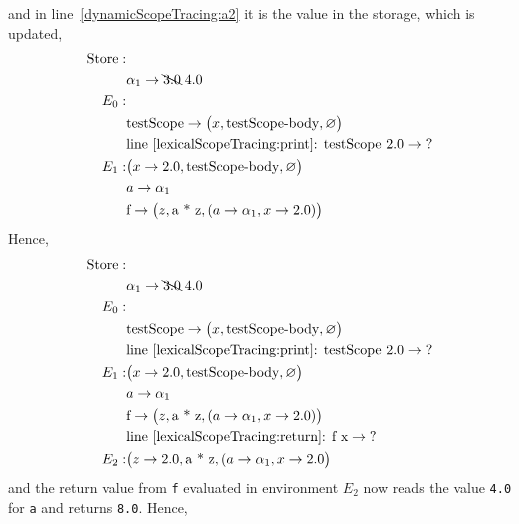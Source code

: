 and in line~\ref{dynamicScopeTracing:a2} it is the value in the storage, which is updated,
\begin{align*}
  \text{Store}: &\\
  & \alpha_1 \rightarrow \bcancel{3.0}\; 4.0\\
  E_0:&\\
      &\text{testScope} \rightarrow \big(x, \text{testScope-body}, \varnothing\big)\\
      & \text{line~\ref{lexicalScopeTracing:print}: testScope 2.0} \rightarrow \text{?}\\
  E_1: & \big(x\rightarrow 2.0, \text{testScope-body}, \varnothing\big)\\
      & a \rightarrow \alpha_1\\
      & \text{f} \rightarrow \big(z, \text{a * z}, (a \rightarrow \alpha_1, x\rightarrow 2.0)\big)\\
\end{align*}
Hence,
\begin{align*}
  \text{Store}: &\\
  & \alpha_1 \rightarrow \bcancel{3.0}\; 4.0\\
  E_0:&\\
      &\text{testScope} \rightarrow \big(x, \text{testScope-body}, \varnothing\big)\\
      & \text{line~\ref{lexicalScopeTracing:print}: testScope 2.0} \rightarrow \text{?}\\
  E_1: & \big(x\rightarrow 2.0, \text{testScope-body}, \varnothing\big)\\
      & a \rightarrow \alpha_1\\
      & \text{f} \rightarrow \big(z, \text{a * z}, (a \rightarrow \alpha_1, x\rightarrow 2.0)\big)\\
      & \text{line~\ref{lexicalScopeTracing:return}: f x} \rightarrow \text{?}\\
  E_2: & \big(z \rightarrow 2.0, \text{a * z}, (a \rightarrow \alpha_1, x\rightarrow 2.0\big)\\
\end{align*}
and the return value from \lstinline!f! evaluated in environment $E_2$ now reads the value \lstinline!4.0! for \lstinline!a! and returns \lstinline!8.0!. Hence,
